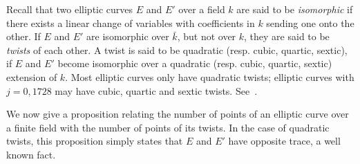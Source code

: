 \documentclass[12pt]{article}
\theoremstyle{plain}
\theoremstyle{definition}
\begin{document}
Recall that two elliptic curves $E$ and $E'$ over a field $k$ are said
to be \emph{isomorphic} if there exists a linear change of variables
with coefficients in $k$ sending one onto the other. If $E$ and $E'$
are isomorphic over $\bar{k}$, but not over $k$, they are said to be
\emph{twists} of each other. A twist is said to be quadratic
(resp. cubic, quartic, sextic), if $E$ and $E'$ become isomorphic over
a quadratic (resp. cubic, quartic, sextic) extension of $k$. Most
elliptic curves only have quadratic twists; elliptic curves with
$j=0,1728$ may have cubic, quartic and sextic twists. See~\cite{Sil}.

We now give a proposition relating the number of points of an elliptic
curve over a finite field with the number of points of its twists.  In
the case of quadratic twists, this proposition simply states that $E$
and $E'$ have opposite trace, a well known fact.
\end{document}
